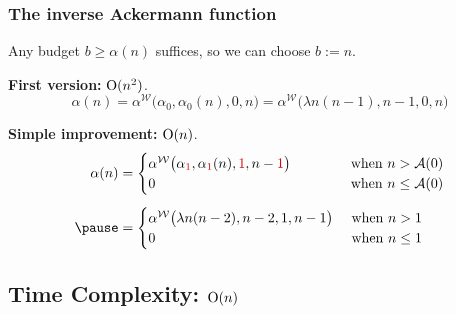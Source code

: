 \begin{frame}
\frametitle{The inverse Ackermann function}

\pause
Any budget $b \ge \alpha(n)$ suffices, so we can choose $b := n$.

\bigskip

\pause
\textbf{First version:} $\text{O}(n^2)$.
\pause
\begin{equation*}
\alpha(n) = \alpha^{\mathcal{W}}\big(\alpha_0, \alpha_0(n), 0, n\big)
= \alpha^{\mathcal{W}}\big(\lambda n(n - 1), n - 1, 0, n\big)
\end{equation*}

\smallskip

\pause
\textbf{Simple improvement:} $\text{O}(n)$.
\pause
\begin{equation*}
\begin{aligned}
\alpha(n) & = \begin{cases}
\alpha^{\mathcal{W}}\big(\alpha_{{\color{red} 1}}, \alpha_{{\color{red} 1}}(n), {{\color{red} 1}}, n - {{\color{red} 1}}\big) & \hspace{3em}\text{ when } n > \Ack(0) \\
0 & \hspace{3em}\text{ when } n \le \Ack(0)
\end{cases} \\[5pt]
\pause & = \begin{cases}
\alpha^{\mathcal{W}}\big(\lambda n(n - 2), n - 2, 1, n - 1\big) & \text{ when } n > 1 \\
0 & \text{ when } n \le 1
\end{cases}
\end{aligned}
\end{equation*}

\end{frame}


\subsection{Time Complexity: $\text{O}(n)$}

